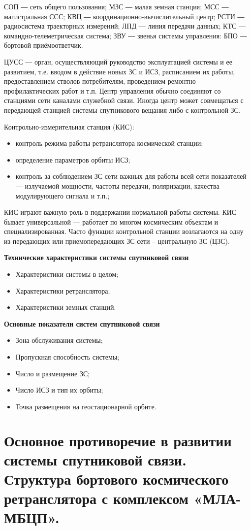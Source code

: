 \documentclass[14pt,a4paper,oneside]{extarticle}
\begin{document}
СОП ― сеть общего пользования; МЗС ― малая земная станция; МСС ― магистральная ССС; КВЦ ― координационно-вычислительный центр; РСТИ ― радиосистема траекторных измерений; ЛПД ― линия передачи данных; КТС ― командно-телеметрическая система; ЗВУ ― звенья системы управления: БПО ― бортовой приёмоответчик.

ЦУСС  ― орган, осуществляющий руководство эксплуатацией системы и ее развитием, т.е. вводом в действие новых ЗС и ИСЗ, расписанием их работы, предоставлением стволов потребителям, проведением ремонтно-профилактических работ и т.п. Центр управления обычно соединяют со станциями сети каналами служебной связи. Иногда центр может совмещаться с передающей станцией системы спутникового вещания либо с контрольной ЗС.

Контрольно-измерительная станция (КИС): 
\begin{itemize}
    \item контроль режима работы ретранслятора космической станции;
    \item определение параметров орбиты ИСЗ;
    \item контроль за соблюдением ЗС сети важных для работы всей сети показателей ― излучаемой мощности, частоты передачи, поляризации, качества модулирующего сигнала и т.п.; 
\end{itemize}

КИС играют важную роль в поддержании нормальной работы системы. КИС бывает универсальной ― работает по многом космическим объектам и специализированная. Часто функции контрольной станции возлагаются на одну из передающих или приемопередающих ЗС сети – центральную ЗС (ЦЗС).

\textbf{Технические характеристики системы спутниковой связи}
\begin{itemize}
    \item Характеристики системы в целом;
    \item Характеристики ретранслятора;
    \item Характеристики земных станций.
    
\end{itemize}

\textbf{Основные показатели систем спутниковой связи}

\begin{itemize}
    \item Зона обслуживания системы;
    \item Пропускная способность системы;
    \item Число и размещение ЗС;
    \item Число ИСЗ и тип их орбиты; 
    \item Точка размещения на геостационарной орбите.
\end{itemize}

\section{Основное противоречие в развитии системы спутниковой связи. Структура бортового космического ретранслятора с комплексом «МЛА-МБЦП».}
\end{document}
